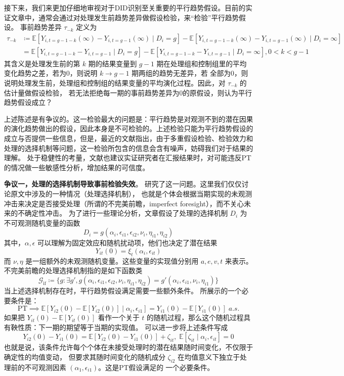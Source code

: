 \documentclass[../didNotes.tex]{subfiles}
\begin{document}
接下来，我们来更加仔细地审视对于DID识别至关重要的平行趋势假设。目前的实证文章中，通常会通过对处理发生前趋势差异做假设检验，来``检验''平行趋势假设。
事前趋势差异 $\tau_{-k}$ 定义为
\begin{align*}
  \tau_{-k} & \coloneqq \mathbb{E}[Y_{i,t=g-1-k}(\infty)-Y_{i,t=g-1}(\infty) \mid D_i = g] -
  \mathbb{E}[Y_{i,t=g-1-k}(\infty)-Y_{i,t=g-1}(\infty) \mid D_i = \infty]                    \\
  & = \mathbb{E}[Y_{i,t=g-1-k}-Y_{i,t=g-1} \mid D_i = g] -
  \mathbb{E}[Y_{i,t=g-1-k}-Y_{i,t=g-1} \mid D_i = \infty], 0 < k < g-1
\end{align*}
其含义是处理发生前的第 $k$ 期的结果变量到 $g-1$ 期在处理组和控制组里的平均变化趋势之差，若为0，则说明 $k \to g-1$ 期两组的趋势无差异，若
全部为0，则说明处理发生前，处理组和控制组的结果变量的平均演化过程。因此，对 $\tau_{-k}$ 的估计量做假设检验，
若无法拒绝每一期的事前趋势差异为0的原假设，则认为平行趋势假设成立？

上述陈述是有争议的。这一检验最大的问题是：平行趋势是对观测不到的潜在因果的演化趋势做出的假设，因此本身是不可检验的。上述检验只能为平行趋势假设的
成立与否提供一些信息，但是，最近的文献指出，由于多重假设检验、检验效力和处理的选择机制等问题，这一检验所包含的信息会含有噪声，妨碍我们对于结果的理解。
处于稳健性的考量，文献也建议实证研究者在汇报结果时，对可能违反PT的情况做一些敏感性分析，增加结果的可信度。

\textbf{争议一，处理的选择机制导致事前检验失效}。\textcite{ghanem2025} 研究了这一问题。这里我们仅仅讨论原文中涉及的一种情况（处理选择机制），
也就是个体会根据当期实现的未观测冲击来决定是否接受处理（所谓的不完美前瞻，imperfect foresight），而不关心未来的不确定性冲击。
为了进行一些理论分析，文章假设了处理的选择机制 $D_{i}$ 为不可观测随机变量的函数
$$
D_{i} = g(\alpha_{i},\epsilon_{i 1}, \epsilon_{i 2}, \nu_{i}, \eta_{i 1}, \eta_{i 2})
$$
其中，$\alpha, \epsilon$ 可以理解为固定效应和随机扰动项，他们也决定了潜在结果
$$
Y_{i t}(0) = \xi_{t}(\alpha_{i}, \epsilon_{i t})
$$
而 $\nu,\eta$ 是一组额外的未观测随机变量。这些变量的实现值分别用 $a,e,v,t$ 来表示。不完美前瞻的处理选择机制指的是如下函数类
$$
\mathcal{G}_{\text{if}} \coloneqq \{ g: \exists g', g(\alpha_{i},\epsilon_{i 1}, \epsilon_{i 2}, \nu_{i},
\eta_{i 1}, \eta_{i 2}) = g'(\alpha_{i},\epsilon_{i 1}, \nu_{i}, \eta_{i 1}) \}
$$
当上述选择机制存在时，平行趋势假设满足需要一些额外条件。\textcite{ghanem2025} 所展示的一个必要条件是：
$$
\text{PT} \implies \mathbb{E}[Y_{i 2}(0)-\mathbb{E}[Y_{i 2}(0)] \mid \alpha_{i},\epsilon_{i 1}] = Y_{i
1}(0)-\mathbb{E}[Y_{i 1}(0)] \; \textit{a.s.}
$$
如果把 $Y_{i t}(0) - \mathbb{E}[Y_{i t}(0)]$ 看作一个关于 $t$ 的随机过程，那么这个随机过程具有鞅性质：下一期的期望等于当期的实现值。
可以进一步将上述条件写成
$$
Y_{i 2}(0) - Y_{i 1}(0) = \mathbb{E}[Y_{i 2}(0) - Y_{i 1}(0)] + \zeta_{i t}, \; \mathbb{E}[\zeta_{i t} \mid
\alpha_{i},\epsilon_{i t}]=0
$$
也就是说，该条件允许每个个体在未接受处理时的潜在结果随时间变化，不仅限于确定性的均值变动，
但要求其随时间变化的随机成分 $\zeta_{i 2}$ 在均值意义下独立于处理前的不可观测因素 $(\alpha_{1},\epsilon_{i 1})$。这是PT假设满足的
一个必要条件。
\end{document}
